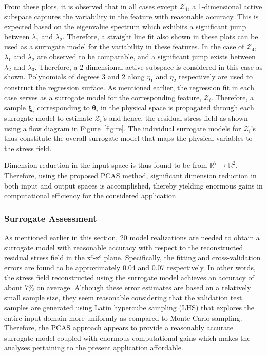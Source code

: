 %
From these plots, it is observed that in all cases except $\mathcal{Z}_4$, a 1-dimensional active
subspace captures the variability in the feature with reasonable accuracy. This is expected based on the
eigenvalue spectrum which exhibits a significant jump between $\lambda_1$ and $\lambda_2$. 
Therefore, a straight line fit also shown in these plots can be used as a surrogate model for the variability in
these features. In the case of $\mathcal{Z}_4$, $\lambda_1$ and $\lambda_2$ are observed to be comparable, and
a significant jump exists between $\lambda_2$ and $\lambda_3$. Therefore, a 2-dimensional active
subspace is considered in this case as shown. Polynomials of degrees 3 and 2 along $\eta_1$ and
$\eta_2$ respectively are used to construct the regression surface. As mentioned earlier,
the regression fit in each case
serves as a surrogate model for the corresponding feature, $\mathcal{Z}_i$. Therefore, a sample $\bm{\xi}_i$
corresponding to $\bm{\theta}_i$ in the physical space is propagated through each surrogate model to estimate
$\mathcal{Z}_i$'s and hence, the residual stress field as shown using a flow diagram in Figure~\ref{fig:re}.
The individual surrogate models for $\mathcal{Z}_i$'s thus constitute the overall surrogate model that maps the 
physical variables to the stress field. 

Dimension reduction in the input space is thus found to be from $\mathbb{R}^7\rightarrow\mathbb{R}^2$.
Therefore, using the proposed PCAS method, significant dimension reduction in both input and output
spaces is accomplished, thereby yielding enormous gains in computational efficiency for the considered application.

\subsubsection{Surrogate Assessment}
\label{subsub:vnv}

As mentioned earlier in this section, 20 model realizations are needed to obtain a surrogate model with
reasonable accuracy with respect to the reconstructed residual stress field in the x$^c$-z$^c$ plane. 
Specifically, the fitting and cross-validation errors are found to be approximately 0.04 and 
0.07 respectively. In other words, the stress field reconstructed using the
surrogate model achieves an accuracy of about 7$\%$ on average. Although these error estimates
are based on a relatively small sample size, they seem reasonable considering that the validation test samples
are generated using Latin hypercube sampling (LHS) that explores the entire input domain more uniformly
as compared to Monte Carlo sampling. Therefore, the PCAS approach appears to provide a reasonably 
accurate surrogate model coupled with enormous computational gains which makes the analyses pertaining to
the present application affordable. 

